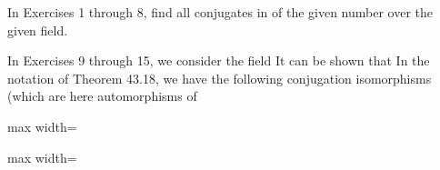 \documentclass[11pt,oneside]{article}
\begin{document}
\begin{BookBody}



\noindent In Exercises 1 through 8, find all conjugates in  of the given number over the given field.









In Exercises 9 through 15, we consider the field  It can be shown that  In the notation of Theorem 43.18, we have the following conjugation isomorphisms (which are here automorphisms of 

\begin{center}\begin{adjustbox}{max width=\linewidth}\end{adjustbox}\end{center}

\begin{center}\begin{adjustbox}{max width=\linewidth}\end{adjustbox}\end{center}


\end{BookBody}
\end{document}
